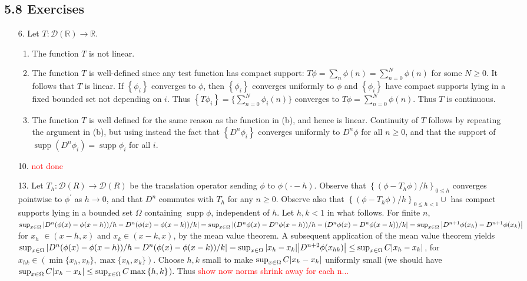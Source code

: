 \documentclass[11pt,leqno]{article}
\theoremstyle{plain}
\theoremstyle{definition}
\numberwithin{equation}{section}
\numberwithin{lem}{section}
\newcommand{\cbr}[1]{\left\{#1\right\}}
\DeclareMathOperator{\supp}{supp}
\begin{document}
\subsection*{5.8 Exercises}
\begin{enumerate}
    \item[6.] Let $T\colon\mathcal D(\mathbb R)\to \mathbb R$.
    \begin{enumerate}
      \item The function $T$ is not linear.
      \item The function $T$ is well-defined since any test function has compact support: $T\phi = \sum_n\phi(n) = \sum_{n=0}^N\phi(n)$ for some $N\geq 0$. It follows that $T$ is linear. If $\cbr{\phi_i}$ converges to $\phi$, then $\cbr{\phi_i}$ converges uniformly to $\phi$ and $\cbr{\phi_i}$ have compact supports lying in a fixed bounded set not depending on $i$. Thus $\cbr{T\phi_i} = \big\{\sum_{n=0}^N\phi_i(n)\big\}$ converges to $T\phi = \sum_{n=0}^N\phi(n)$. Thus $T$ is continuous.
      \item The function $T$ is well defined for the same reason as the function in (b), and hence is linear. Continuity of $T$ follows by repeating the argument in (b), but using instead the fact that $\cbr{D^n\phi_i}$ converges uniformly to $D^n\phi$ for all $n\geq 0$, and that the support of $\supp(D^n\phi_i)=\supp{\phi_i}$ for all $i$.
    \end{enumerate}
    \item[10.] \textcolor{red}{not done}\newpage
    \item[13.] Let $T_h\colon \mathcal D(R)\to\mathcal D(R)$ be the translation operator sending $\phi$ to $\phi(\cdot-h)$. Observe that $\cbr{(\phi-T_h\phi)/h}_{0\leq h}$ converges pointwise to $\phi^\prime$ as $h\to 0$, and that $D^n$ commutes with $T_h$ for any $n\geq 0$. Observe also that $\cbr{(\phi-T_h\phi)/h}_{0\leq h<1}\cup $ has compact supports lying in a bounded set $\Omega$ containing $\supp \phi$, independent of $h$. Let $h,k<1$ in what follows. For finite $n$, $\sup_{x\in \Omega}\abs{D^n(\phi(x)-\phi(x-h))/h -D^n(\phi(x)-\phi(x-k))/k} = \sup_{x\in \Omega}\abs{(D^n\phi(x)-D^n\phi(x-h))/h -(D^n\phi(x)-D^n\phi(x-k))/k} = \sup_{x\in \Omega}\abs{D^{n+1}\phi(x_h) -D^{n+1}\phi(x_k)}$ for $x_h$ $\in (x-h,x)$ and $x_k\in (x-k,x)$, by the mean value theorem. A subsequent application of the mean value theorem yields $\sup_{x\in \Omega}\abs{D^n(\phi(x)-\phi(x-h))/h -D^n(\phi(x)-\phi(x-k))/k} = \sup_{x\in \Omega}\abs{x_h-x_k}\abs{D^{n+2}\phi(x_{hk})} \leq \sup_{x\in \Omega}C\abs{x_h-x_k}$, for $x_{hk}\in (\min\{x_h,x_k\},\max\{x_h,x_k\})$. Choose $h,k$ small to make $\sup_{x\in \Omega}C\abs{x_h-x_k}$ uniformly small (we should have $\sup_{x\in \Omega}C\abs{x_h-x_k}\leq \sup_{x\in \Omega}C\max\cbr{h,k}$). Thus \textcolor{red}{show now norms shrink away for each n...}
\end{enumerate}
\end{document}
